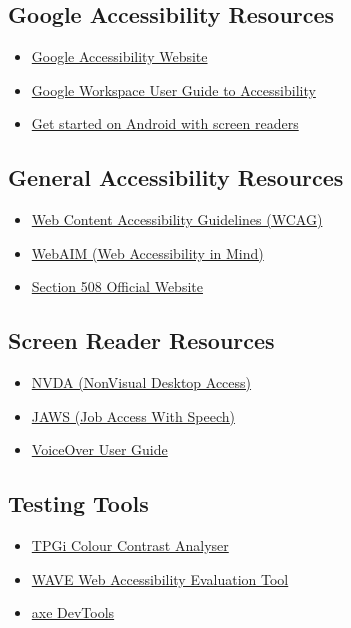 \subsection{Google Accessibility Resources}\label{ch15:ssec:google-resources}
\begin{itemize}
	\item \href{https://www.google.com/accessibility/}{Google Accessibility Website}
	\item \href{https://support.google.com/a/users/answer/9322387}{Google Workspace User Guide to Accessibility}
	\item \href{https://support.google.com/accessibility/android/answer/6378524}{Get started on Android with screen readers}
\end{itemize}

\subsection{General Accessibility Resources}\label{ch15:ssec:general-resources}
\begin{itemize}
	\item \href{https://www.w3.org/WAI/standards-guidelines/wcag/}{Web Content Accessibility Guidelines (WCAG)}
	\item \href{https://webaim.org/}{WebAIM (Web Accessibility in Mind)}
	\item \href{https://www.section508.gov/}{Section 508 Official Website}
\end{itemize}

\subsection{Screen Reader Resources}\label{ch15:ssec:sr-resources}
\begin{itemize}
	\item \href{https://www.nvaccess.org/}{NVDA (NonVisual Desktop Access)}
	\item \href{https://www.freedomscientific.com/products/\gidx{software}{software}/jaws/}{JAWS (Job Access With Speech)}
	\item \href{https://www.apple.com/voiceover/info/guide/_1121.html}{VoiceOver User Guide}
\end{itemize}

\subsection{Testing Tools}\label{ch15:ssec:testing-tools}
\begin{itemize}
	\item \href{https://www.tpgi.com/color-contrast-checker/}{TPGi Colour Contrast Analyser}
	\item \href{https://wave.webaim.org/}{WAVE Web Accessibility Evaluation Tool}
	\item \href{https://www.deque.com/axe/}{axe DevTools}
\end{itemize}

